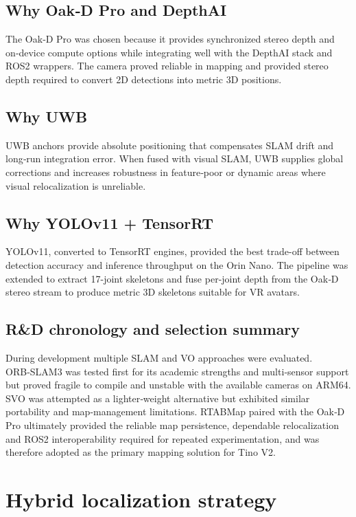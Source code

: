\subsection*{Why Oak‑D Pro and DepthAI}
The Oak‑D Pro was chosen because it provides synchronized stereo depth and on‑device compute options while integrating well with the DepthAI stack and ROS2 wrappers. The camera proved reliable in mapping and provided stereo depth required to convert 2D detections into metric 3D positions.

\subsection*{Why UWB}
UWB anchors provide absolute positioning that compensates SLAM drift and long‑run integration error. When fused with visual SLAM, UWB supplies global corrections and increases robustness in feature‑poor or dynamic areas where visual relocalization is unreliable.

\subsection*{Why YOLOv11 + TensorRT}
YOLOv11, converted to TensorRT engines, provided the best trade-off between detection accuracy and inference throughput on the Orin Nano. The pipeline was extended to extract 17-joint skeletons and fuse per-joint depth from the Oak‑D stereo stream to produce metric 3D skeletons suitable for VR avatars.

\subsection*{R\&D chronology and selection summary}
During development multiple SLAM and VO approaches were evaluated. ORB‑SLAM3 was tested first for its academic strengths and multi‑sensor support but proved fragile to compile and unstable with the available cameras on ARM64. SVO was attempted as a lighter‑weight alternative but exhibited similar portability and map‑management limitations. RTABMap paired with the Oak‑D Pro ultimately provided the reliable map persistence, dependable relocalization and ROS2 interoperability required for repeated experimentation, and was therefore adopted as the primary mapping solution for Tino V2.

\section{Hybrid localization strategy}

